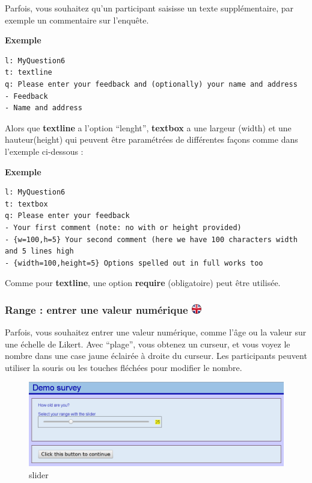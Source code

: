 \documentclass[
]{book}
\begin{document}
Parfois, vous souhaitez qu'un participant saisisse un texte
supplémentaire, par exemple un commentaire sur l'enquête.

\textbf{Exemple}

\begin{verbatim}
l: MyQuestion6
t: textline
q: Please enter your feedback and (optionally) your name and address
- Feedback
- Name and address
\end{verbatim}

Alors que \textbf{textline} a l'option ``lenght'', \textbf{textbox} a
une largeur (width) et une hauteur(height) qui peuvent être paramétrées
de différentes façons comme dans l'exemple ci-dessous :

\textbf{Exemple}

\begin{verbatim}
l: MyQuestion6
t: textbox
q: Please enter your feedback
- Your first comment (note: no with or height provided)
- {w=100,h=5} Your second comment (here we have 100 characters width and 5 lines high
- {width=100,height=5} Options spelled out in full works too
\end{verbatim}

Comme pour \textbf{textline}, une option \textbf{require} (obligatoire)
peut être utilisée.

\hypertarget{range-entrer-une-valeur-numuxe9rique-ukflag}{%
\subsubsection[Range : entrer une valeur numérique
]{\texorpdfstring{Range : entrer une valeur numérique
\href{https://www.psytoolkit.org/doc3.2.0/online-survey-syntax.html\#range}{\protect\includegraphics{img/ukflag.png}}}{Range : entrer une valeur numérique ukflag}}\label{range-entrer-une-valeur-numuxe9rique-ukflag}}

Parfois, vous souhaitez entrer une valeur numérique, comme l'âge ou la
valeur sur une échelle de Likert. Avec ``plage'', vous obtenez un
curseur, et vous voyez le nombre dans une case jaune éclairée à droite
du curseur. Les participants peuvent utiliser la souris ou les touches
fléchées pour modifier le nombre.

\begin{figure}
\centering
\includegraphics{img/slider.png}
\caption{slider}
\end{figure}
\end{document}

